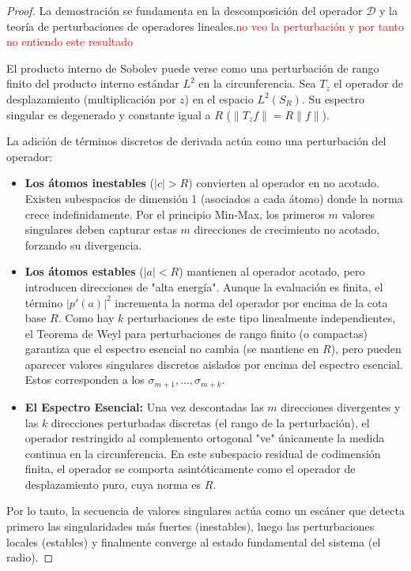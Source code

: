 \documentclass[12pt,a4paper]{article}
\begin{document}
\begin{proof}
La demostración se fundamenta en la descomposición del operador $\mathcal{D}$ y la teoría de perturbaciones de operadores lineales.\textcolor{red}{no veo la perturbación y por tanto no entiendo este resultado}

El producto interno de Sobolev puede verse como una perturbación de rango finito del producto interno estándar $L^2$ en la circunferencia. Sea $T_z$ el operador de desplazamiento (multiplicación por $z$) en el espacio $L^2(S_R)$. Su espectro singular es degenerado y constante igual a $R$ ($\|T_z f\| = R\|f\|$).

La adición de términos discretos de derivada actúa como una perturbación del operador: 
\begin{itemize}
    \item \textbf{Los átomos inestables} ($|c|>R$) convierten al operador en no acotado. Existen subespacios de dimensión 1 (asociados a cada átomo) donde la norma crece indefinidamente. Por el principio Min-Max, los primeros $m$ valores singulares deben capturar estas $m$ direcciones de crecimiento no acotado, forzando su divergencia.
    
    \item \textbf{Los átomos estables} ($|a|<R$) mantienen al operador acotado, pero introducen direcciones de "alta energía". Aunque la evaluación es finita, el término $|p'(a)|^2$ incrementa la norma del operador por encima de la cota base $R$. Como hay $k$ perturbaciones de este tipo linealmente independientes, el Teorema de Weyl para perturbaciones de rango finito (o compactas) garantiza que el espectro esencial no cambia (se mantiene en $R$), pero pueden aparecer valores singulares discretos aislados por encima del espectro esencial. Estos corresponden a los $\sigma_{m+1}, \dots, \sigma_{m+k}$.
    
    \item \textbf{El Espectro Esencial:} Una vez descontadas las $m$ direcciones divergentes y las $k$ direcciones perturbadas discretas (el rango de la perturbación), el operador restringido al complemento ortogonal "ve" únicamente la medida continua en la circunferencia. En este subespacio residual de codimensión finita, el operador se comporta asintóticamente como el operador de desplazamiento puro, cuya norma es $R$.
\end{itemize}

Por lo tanto, la secuencia de valores singulares actúa como un escáner que detecta primero las singularidades más fuertes (inestables), luego las perturbaciones locales (estables) y finalmente converge al estado fundamental del sistema (el radio).
\end{proof}
\end{document}
